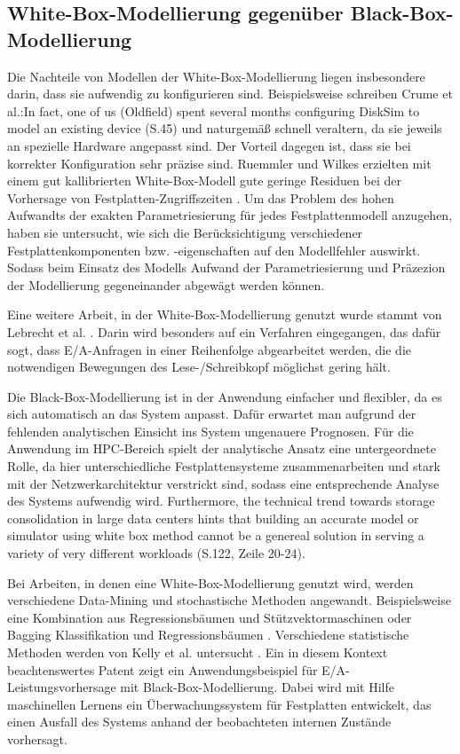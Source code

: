 \documentclass[
	12pt,
	a4paper,
	BCOR10mm,
	DIV14,
	listof=totoc,
	bibliography=totoc,
	headsepline
]{scrreprt}
\begin{document}
\subsection{White-Box-Modellierung gegenüber Black-Box-Modellierung}
Die Nachteile von Modellen der White-Box-Modellierung liegen insbesondere darin, dass sie aufwendig zu konfigurieren sind. Beispielsweise schreiben Crume et al.:\glqq In fact, one of us (Oldfield) spent several months configuring DiskSim to model an existing device\grqq{} \cite{Crume:2013:FML:2538542.2538561} (S.45) und naturgemäß schnell veraltern, da sie jeweils an spezielle Hardware angepasst sind. Der Vorteil dagegen ist, dass sie bei korrekter Konfiguration sehr präzise sind. Ruemmler und Wilkes erzielten mit einem gut kallibrierten White-Box-Modell gute geringe Residuen bei der Vorhersage von Festplatten-Zugriffszeiten \cite{Ruemmler94anintroduction}. Um das Problem des hohen Aufwandts der exakten Parametriesierung für jedes Festplattenmodell anzugehen, haben sie untersucht, wie sich die Berücksichtigung verschiedener Festplattenkomponenten bzw. -eigenschaften auf den Modellfehler auswirkt. Sodass beim Einsatz des Modells Aufwand der Parametriesierung und Präzezion der Modellierung gegeneinander abgewägt werden können.

Eine weitere Arbeit, in der White-Box-Modellierung genutzt wurde stammt von Lebrecht et al. \cite{Lebrecht:2009:10.1109/QEST.2009.31}. Darin wird besonders auf ein Verfahren eingegangen, das dafür sogt, dass E/A-Anfragen in einer Reihenfolge abgearbeitet werden, die die notwendigen Bewegungen des Lese-/Schreibkopf möglichst gering hält.
\medskip

Die Black-Box-Modellierung ist in der Anwendung einfacher und flexibler, da es sich automatisch an das System anpasst. Dafür erwartet man aufgrund der fehlenden analytischen Einsicht ins System ungenauere Prognosen. Für die Anwendung im HPC-Bereich spielt der analytische Ansatz eine untergeordnete Rolle, da hier unterschiedliche Festplattensysteme zusammenarbeiten und stark mit der Netzwerkarchitektur verstrickt sind, sodass eine entsprechende Analyse des Systems aufwendig wird. \glqq Furthermore, the technical trend towards storage consolidation in large data centers hints that building an accurate model or simulator using white box method cannot be a genereal solution in serving a variety of very different workloads\grqq{} \cite{DBLP:conf/npc/ZhangLZJC10} (S.122, Zeile 20-24).

Bei Arbeiten, in denen eine White-Box-Modellierung genutzt wird, werden verschiedene Data-Mining und stochastische Methoden angewandt. Beispielsweise eine Kombination aus Regressionsbäumen und Stützvektormaschinen \cite{Dai:2012:SDP:2477169.2477214} oder Bagging Klassifikation und Regressionsbäumen \cite{DBLP:conf/npc/ZhangLZJC10}. Verschiedene statistische Methoden werden von Kelly et al. untersucht \cite{Kelly04inducingmodels}.
Ein in diesem Kontext beachtenswertes Patent \cite{gough2012predicting} zeigt ein Anwendungsbeispiel für E/A-Leistungsvorhersage mit Black-Box-Modellierung. Dabei wird mit Hilfe maschinellen Lernens ein Überwachungssystem für Festplatten entwickelt, das einen Ausfall des Systems anhand der beobachteten internen Zustände vorhersagt. 
\end{document}

